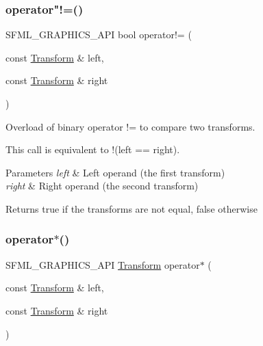 \subsubsection{\texorpdfstring{operator"!=()}{operator!=()}}
{\footnotesize\ttfamily S\+F\+M\+L\+\_\+\+G\+R\+A\+P\+H\+I\+C\+S\+\_\+\+A\+PI bool operator!= (\begin{DoxyParamCaption}\item[{const \mbox{\hyperlink{classsf_1_1_transform}{Transform}} \&}]{left,  }\item[{const \mbox{\hyperlink{classsf_1_1_transform}{Transform}} \&}]{right }\end{DoxyParamCaption})\hspace{0.3cm}{\ttfamily [related]}}



Overload of binary operator != to compare two transforms. 

This call is equivalent to !(left == right).


\begin{DoxyParams}{Parameters}
{\em left} & Left operand (the first transform) \\
\hline
{\em right} & Right operand (the second transform)\\
\hline
\end{DoxyParams}
\begin{DoxyReturn}{Returns}
true if the transforms are not equal, false otherwise \begin{DoxyVerb}\end{DoxyVerb}
 
\end{DoxyReturn}
\mbox{\label{classsf_1_1_transform_a423ade8d6aa1378c695f8eb4bfce8981}} 
\subsubsection{\texorpdfstring{operator$\ast$()}{operator*()}\hspace{0.1cm}{\footnotesize\ttfamily [1/2]}}
{\footnotesize\ttfamily S\+F\+M\+L\+\_\+\+G\+R\+A\+P\+H\+I\+C\+S\+\_\+\+A\+PI \mbox{\hyperlink{classsf_1_1_transform}{Transform}} operator$\ast$ (\begin{DoxyParamCaption}\item[{const \mbox{\hyperlink{classsf_1_1_transform}{Transform}} \&}]{left,  }\item[{const \mbox{\hyperlink{classsf_1_1_transform}{Transform}} \&}]{right }\end{DoxyParamCaption})\hspace{0.3cm}{\ttfamily [related]}}




